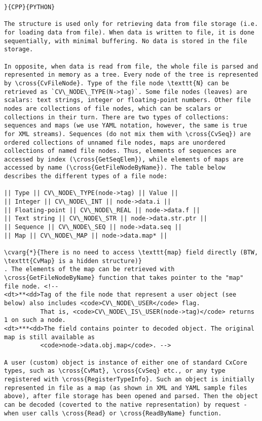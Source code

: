 \begin{verbatim}
}{CPP}{PYTHON}

The structure is used only for retrieving data from file storage (i.e. for loading data from file). When data is written to file, it is done sequentially, with minimal buffering. No data is stored in the file storage.

In opposite, when data is read from file, the whole file is parsed and represented in memory as a tree. Every node of the tree is represented by \cross{CvFileNode}. Type of the file node \texttt{N} can be retrieved as `CV\_NODE\_TYPE(N->tag)`. Some file nodes (leaves) are scalars: text strings, integer or floating-point numbers. Other file nodes are collections of file nodes, which can be scalars or collections in their turn. There are two types of collections: sequences and maps (we use YAML notation, however, the same is true for XML streams). Sequences (do not mix them with \cross{CvSeq}) are ordered collections of unnamed file nodes, maps are unordered collections of named file nodes. Thus, elements of sequences are accessed by index (\cross{GetSeqElem}), while elements of maps are accessed by name (\cross{GetFileNodeByName}). The table below describes the different types of a file node:

|| Type || CV\_NODE\_TYPE(node->tag) || Value ||
|| Integer || CV\_NODE\_INT || node->data.i ||
|| Floating-point || CV\_NODE\_REAL || node->data.f ||
|| Text string || CV\_NODE\_STR || node->data.str.ptr ||
|| Sequence || CV\_NODE\_SEQ || node->data.seq ||
|| Map || CV\_NODE\_MAP || node->data.map* ||

\cvarg{*}{There is no need to access \texttt{map} field directly (BTW, \texttt{CvMap} is a hidden structure)}
. The elements of the map can be retrieved with \cross{GetFileNodeByName} function that takes pointer to the "map" file node. <!--
<dt>**<dd>Tag of the file node that represent a user object (see below) also includes <code>CV\_NODE\_USER</code> flag.
          That is, <code>CV\_NODE\_IS\_USER(node->tag)</code> returns 1 on such a node.
<dt>***<dd>The field contains pointer to decoded object. The original map is still available as
          <code>node->data.obj.map</code>. -->

A user (custom) object is instance of either one of standard CxCore types, such as \cross{CvMat}, \cross{CvSeq} etc., or any type registered with \cross{RegisterTypeInfo}. Such an object is initially represented in file as a map (as shown in XML and YAML sample files above), after file storage has been opened and parsed. Then the object can be decoded (coverted to the native representation) by request - when user calls \cross{Read} or \cross{ReadByName} function.


\end{verbatim}
